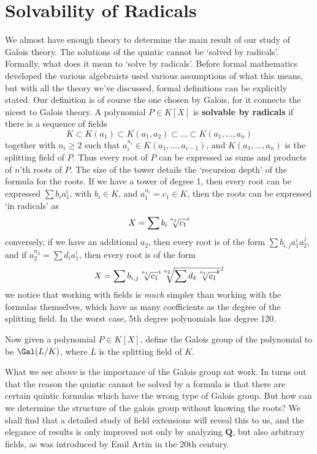 \section{Solvability of Radicals}

We almost have enough theory to determine the main result of our study of Galois theory. The solutions of the quintic cannot be `solved by radicals'. Formally, what does it mean to `solve by radicals'. Before formal mathematics developed the various algebraists used various assumptions of what this means, but with all the theory we've discussed, formal definitions can be explicitly stated. Our definition is of course the one chosen by Galois, for it connects the nicest to Galois theory. A polynomial $P \in K[X]$ is {\bf solvable by radicals} if there is a sequence of fields
%
\[ K \subset K(a_1) \subset K(a_1, a_2) \subset \dots \subset K(a_1, \dots, a_n) \]
%
together with $n_i \geq 2$ such that $a_i^{n_i} \in K(a_1, \dots, a_{i-1})$, and $K(a_1, \dots, a_n)$ is the splitting field of $P$. Thus every root of $P$ can be expressed as sums and products of $n$'th roots of $P$. The size of the tower details the `recursion depth' of the formula for the roots. If we have a tower of degree 1, then every root can be expressed $\sum b_i a_1^i$, with $b_i \in K$, and $a_1^{n_i} = c_1 \in K$, then the roots can be expressed `in radicals' as
%
\[ X = \sum b_i \sqrt[\uproot{5}n_1]{c_1}^i \]
%
conversely, if we have an additional $a_2$, then every root is of the form $\sum b_{i,j} a_1^i a_2^j$, and if $a_2^{n_2} = \sum d_i a_1^i$, then every root is of the form
%
\[ X = \sum b_{i,j} \sqrt[\uproot{5}n_1]{c_1}^i \sqrt[\uproot{5}n_2]{\sum d_k \sqrt[\uproot{5}n_1]{c_1}^k}^j \]
%
we notice that working with fields is {\it much} simpler than working with the formulas themselves, which have as many coefficients as the degree of the splitting field. In the worst case, 5th degree polynomials has degree 120.

Now given a polynomial $P \in K[X]$, define the Galois group of the polynomial to be $\Gal(L/K)$, where $L$ is the splitting field of $K$.











What we see above is the importance of the Galois group sat work. In turns out that the reason the quintic cannot be solved by a formula is that there are certain quintic formulas which have the wrong type of Galois group. But how can we determine the structure of the galois group without knowing the roots? We shall find that a detailed study of field extensions will reveal this to us, and the elegance of results is only improved not only by analyzing $\mathbf{Q}$, but also arbitrary fields, as was introduced by Emil Artin in the 20th century.

